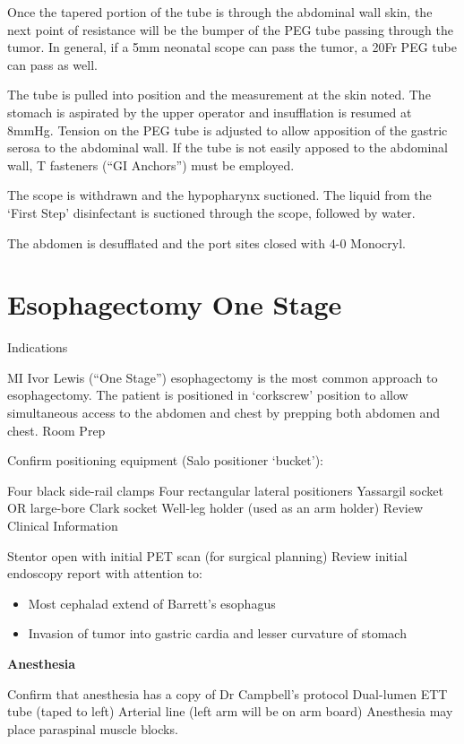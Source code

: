 \documentclass[
]{book}
\providecommand{\tightlist}{%
  \setlength{\itemsep}{0pt}\setlength{\parskip}{0pt}}
\begin{document}
Once the tapered portion of the tube is through the abdominal wall skin, the next point of resistance will be the bumper of the PEG tube passing through the tumor. In general, if a 5mm neonatal scope can pass the tumor, a 20Fr PEG tube can pass as well.

The tube is pulled into position and the measurement at the skin noted. The stomach is aspirated by the upper operator and insufflation is resumed at 8mmHg. Tension on the PEG tube is adjusted to allow apposition of the gastric serosa to the abdominal wall. If the tube is not easily apposed to the abdominal wall, T fasteners (``GI Anchors'') must be employed.

The scope is withdrawn and the hypopharynx suctioned. The liquid from the `First Step' disinfectant is suctioned through the scope, followed by water.

The abdomen is desufflated and the port sites closed with 4-0 Monocryl.

\hypertarget{esophagectomy-one-stage}{%
\chapter{Esophagectomy One Stage}\label{esophagectomy-one-stage}}

Indications

MI Ivor Lewis (``One Stage'') esophagectomy is the most common approach to esophagectomy. The patient is positioned in `corkscrew' position to allow simultaneous access to the abdomen and chest by prepping both abdomen and chest. Room Prep

Confirm positioning equipment (Salo positioner `bucket'):

Four black side-rail clamps
Four rectangular lateral positioners
Yassargil socket OR large-bore Clark socket
Well-leg holder (used as an arm holder)
Review Clinical Information

Stentor open with initial PET scan (for surgical planning)
Review initial endoscopy report with attention to:

\begin{itemize}
\tightlist
\item
  Most cephalad extend of Barrett's esophagus
\item
  Invasion of tumor into gastric cardia and lesser curvature of stomach
\end{itemize}

\textbf{Anesthesia}

Confirm that anesthesia has a copy of Dr Campbell's protocol
Dual-lumen ETT tube (taped to left)
Arterial line (left arm will be on arm board)
Anesthesia may place paraspinal muscle blocks.
\end{document}
